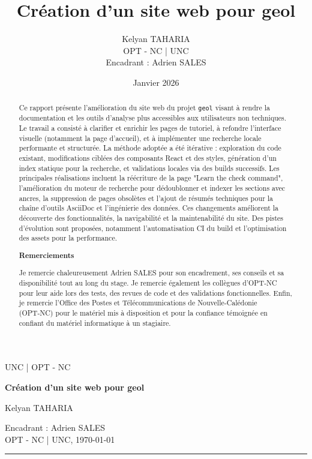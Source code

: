 \documentclass[12pt,a4paper]{report}
\title{Création d'un site web pour geol}
\author{Kelyan TAHARIA\\OPT - NC | UNC\\Encadrant : Adrien SALES}
\date{Janvier 2026}
\newcommand{\HRule}{\rule{\linewidth}{0.5mm}}
\begin{document}
\begin{titlepage}
  \centering
  {\scshape\LARGE UNC | OPT - NC \par}
  \vspace{1.5cm}
  {\huge\bfseries Création d'un site web pour geol \par}
  \vspace{1.5cm}
  {\Large Kelyan TAHARIA \par}
  \vfill
  Encadrant : Adrien SALES \\
  OPT - NC | UNC, \today
  \vspace{1cm}
  \HRule
\end{titlepage}

\begin{abstract}
  \noindent Ce rapport présente l'amélioration du site web du projet \texttt{geol} visant à rendre la documentation et les outils d'analyse plus accessibles aux utilisateurs non techniques. Le travail a consisté à clarifier et enrichir les pages de tutoriel, à refondre l'interface visuelle (notamment la page d'accueil), et à implémenter une recherche locale performante et structurée. La méthode adoptée a été itérative : exploration du code existant, modifications ciblées des composants React et des styles, génération d'un index statique pour la recherche, et validations locales via des builds successifs. Les principales réalisations incluent la réécriture de la page "Learn the check command", l'amélioration du moteur de recherche pour dédoublonner et indexer les sections avec ancres, la suppression de pages obsolètes et l'ajout de résumés techniques pour la chaîne d'outils AsciiDoc et l'ingénierie des données. Ces changements améliorent la découverte des fonctionnalités, la navigabilité et la maintenabilité du site. Des pistes d'évolution sont proposées, notamment l'automatisation CI du build et l'optimisation des assets pour la performance.

\bigskip
\begin{center}\textbf{Remerciements}\end{center}
\bigskip
Je remercie chaleureusement Adrien SALES pour son encadrement, ses conseils et sa disponibilité tout au long du stage.
Je remercie également les collègues d'OPT‑NC pour leur aide lors des tests, des revues de code et des validations fonctionnelles. 
Enfin, je remercie l'Office des Postes et Télécommunications de Nouvelle‑Calédonie (OPT‑NC) pour le matériel mis à disposition et pour la confiance témoignée en confiant du matériel informatique à un stagiaire.
\end{abstract}
\end{document}
